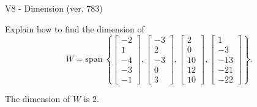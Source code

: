 \begin{exercise}
  \begin{exerciseTitle}V8 - Dimension (ver. 783)\end{exerciseTitle}
  \begin{exerciseStatement}
    Explain how to find the dimension of 
\[W=\mathrm{span}\ \left\{\left[\begin{array}{r}
-2 \\
1 \\
-4 \\
-3 \\
-1
\end{array}\right] , \left[\begin{array}{r}
-3 \\
2 \\
-3 \\
0 \\
3
\end{array}\right] , \left[\begin{array}{r}
2 \\
0 \\
10 \\
12 \\
10
\end{array}\right] , \left[\begin{array}{r}
1 \\
-3 \\
-13 \\
-21 \\
-22
\end{array}\right]\right\}.\]



  \end{exerciseStatement}
  \begin{exerciseAnswer}
   The dimension of \(W\) is  \(2\).
  


  \end{exerciseAnswer}
\end{exercise}